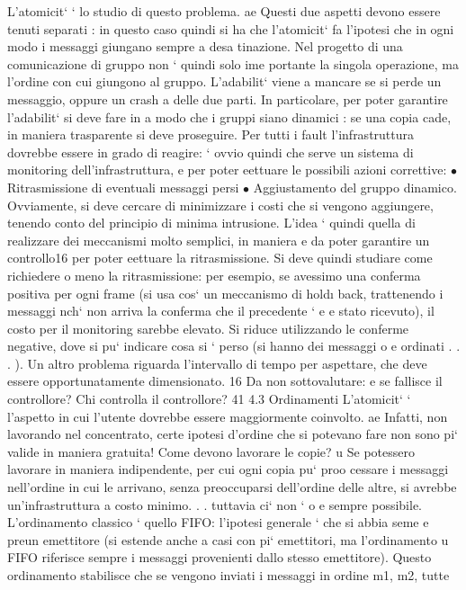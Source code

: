 \documentclass[a4paper,12pt]{article}
\begin{document}
L'atomicit` ` lo studio di questo problema.
ae
Questi due aspetti devono essere tenuti separati : in questo caso quindi si ha
che l'atomicit` fa l'ipotesi che in ogni modo i messaggi giungano sempre a desa
tinazione. Nel progetto di una comunicazione di gruppo non ` quindi solo ime
portante la singola operazione, ma l'ordine con cui giungono al gruppo.
L'adabilit` viene a mancare se si perde un messaggio, oppure un crash
a
delle due parti. In particolare, per poter garantire l'adabilit` si deve fare in
a
modo che i gruppi siano dinamici : se una copia cade, in maniera trasparente
si deve proseguire. Per tutti i fault l'infrastruttura dovrebbe essere in grado di
reagire: ` ovvio quindi che serve un sistema di monitoring dell'infrastruttura,
e
per poter eettuare le possibili azioni correttive:
$\bullet$ Ritrasmissione di eventuali messaggi persi
$\bullet$ Aggiustamento del gruppo dinamico.
Ovviamente, si deve cercare di minimizzare i costi che si vengono aggiungere,
tenendo conto del principio di minima intrusione.
L'idea ` quindi quella di realizzare dei meccanismi molto semplici, in maniera
e
da poter garantire un controllo16 per poter eettuare la ritrasmissione. Si deve
quindi studiare come richiedere o meno la ritrasmissione: per esempio, se avessimo una conferma positiva per ogni frame
(si usa cos` un meccanismo di hold\i{}
back, trattenendo i messaggi nch` non arriva la conferma che il precedente `
e
e
stato ricevuto), il costo per il monitoring sarebbe elevato. Si riduce utilizzando
le conferme negative, dove si pu` indicare cosa si ` perso (si hanno dei messaggi
o
e
ordinati . . . ). Un altro problema riguarda l'intervallo di tempo per aspettare,
che deve essere opportunatamente dimensionato.
16 Da
non sottovalutare: e se fallisce il controllore? Chi controlla il controllore?
41
4.3
Ordinamenti
L'atomicit` ` l'aspetto in cui l'utente dovrebbe essere maggiormente coinvolto.
ae
Infatti, non lavorando nel concentrato, certe ipotesi d'ordine che si potevano
fare non sono pi` valide in maniera gratuita! Come devono lavorare le copie?
u
Se potessero lavorare in maniera indipendente, per cui ogni copia pu` proo
cessare i messaggi nell'ordine in cui le arrivano, senza preoccuparsi dell'ordine
delle altre, si avrebbe un'infrastruttura a costo minimo. . . tuttavia ci` non `
o
e
sempre possibile.
L'ordinamento classico ` quello FIFO: l'ipotesi generale ` che si abbia seme
e
preun emettitore (si estende anche a casi con pi` emettitori, ma l'ordinamento
u
FIFO riferisce sempre i messaggi provenienti dallo stesso emettitore). Questo
ordinamento stabilisce che se vengono inviati i messaggi in ordine m1, m2, tutte
\end{document}
